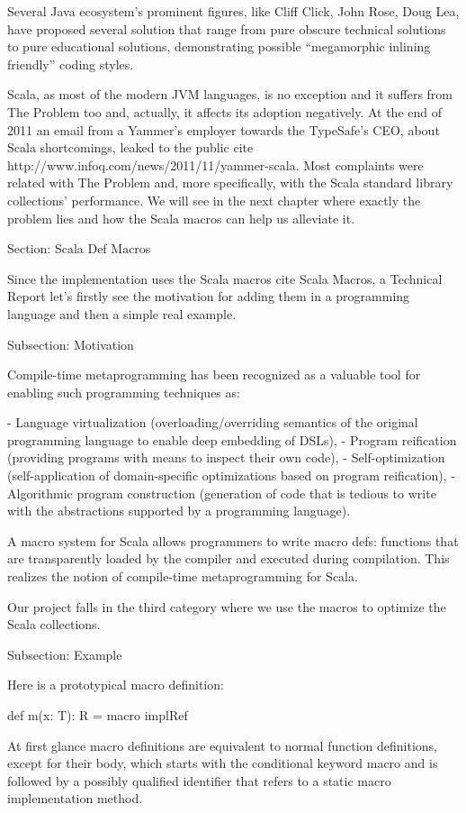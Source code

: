 Several Java ecosystem's prominent figures, like Cliff Click, John Rose, Doug
Lea, have proposed several solution that range from pure obscure technical
solutions to pure educational solutions, demonstrating possible ``megamorphic
inlining friendly'' coding styles.

Scala, as most of the modern JVM languages, is no exception and it suffers from
The Problem too and, actually, it affects its adoption negatively. At the end of
2011 an email from a Yammer's employer towards the TypeSafe's CEO, about Scala
shortcomings, leaked to the public {cite
http://www.infoq.com/news/2011/11/yammer-scala}. Most complaints were related
with The Problem and, more specifically, with the Scala standard
library collections' performance. We will see in the next chapter where exactly
the problem lies and how the Scala macros can help us alleviate it.


Section: Scala Def Macros

Since the implementation uses the Scala macros {cite Scala Macros, a Technical
Report} let's firstly see the motivation for adding them in a programming
language and then a simple real example.


Subsection: Motivation

Compile-time metaprogramming has been recognized as a valuable tool for enabling
such programming techniques as:

- Language virtualization (overloading/overriding semantics of the original
programming language to enable deep embedding of DSLs),
- Program reification (providing programs with means to inspect their own code),
- Self-optimization (self-application of domain-specific optimizations based on
program reification),
- Algorithmic program construction (generation of code that is tedious to write
with the abstractions supported by a programming language).

A macro system for Scala allows programmers to write macro defs: functions that
are transparently loaded by the compiler and executed during compilation. This
realizes the notion of compile-time metaprogramming for Scala.

Our project falls in the third category where we use the macros to optimize the
Scala collections.


Subsection: Example

Here is a prototypical macro definition:

def m(x: T): R = macro implRef

At first glance macro definitions are equivalent to normal function definitions,
except for their body, which starts with the conditional keyword macro and is
followed by a possibly qualified identifier that refers to a static macro
implementation method.

